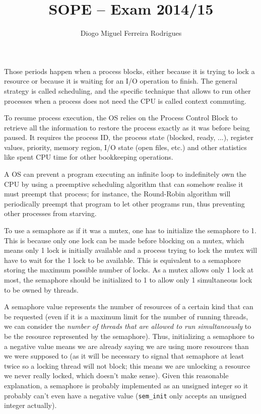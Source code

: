 \documentclass{sope}
\title{SOPE -- Exam 2014/15}
\author{Diogo Miguel Ferreira Rodrigues \\ \email{dmfrodrigues2000@gmail.com}}
\begin{document}
\setcounter{chapter}{14}
Those periods happen when a process blocks, either because it is trying to lock a resource or because it is waiting for an I/O operation to finish. The general strategy is called scheduling, and the specific technique that allows to run other processes when a process does not need the CPU is called context commuting.

To resume process execution, the OS relies on the Process Control Block to retrieve all the information to restore the process exactly as it was before being paused. It requires the process ID, the process state (blocked, ready, ...), register values, priority, memory region, I/O state (open files, etc.) and other statistics like spent CPU time for other bookkeeping operations.

A OS can prevent a program executing an infinite loop to indefinitely own the CPU by using a preemptive scheduling algorithm that can somehow realise it must preempt that process; for instance, the Round-Robin algorithm will periodically preempt that program to let other programs run, thus preventing other processes from starving.

To use a semaphore as if it was a mutex, one has to initialize the semaphore to 1. This is because only one lock can be made before blocking on a mutex, which means only 1 lock is initially available and a process trying to lock the mutex will have to wait for the 1 lock to be available. This is equivalent to a semaphore storing the maximum possible number of locks. As a mutex allows only 1 lock at most, the semaphore should be initialized to 1 to allow only 1 simultaneous lock to be owned by threads.

A semaphore value represents the number of resources of a certain kind that can be requested (even if it is a maximum limit for the number of running threads, we can consider the \emph{number of threads that are allowed to run simultaneously} to be the resource represented by the semaphore). Thus, initializing a semaphore to a negative value means we are already saying we are using more resources than we were supposed to (as it will be necessary to signal that semaphore at least twice so a locking thread will not block; this means we are unlocking a resource we never really locked, which doesn't make sense). Given this reasonable explanation, a semaphore is probably implemented as an unsigned integer so it probably can't even have a negative value (\texttt{sem\_init} only accepts an unsigned integer actually).
\end{document}
